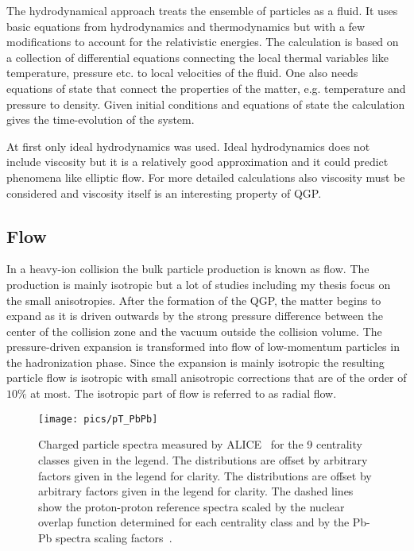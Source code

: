 
The hydrodynamical approach treats the ensemble of particles as a fluid. It uses  basic equations from hydrodynamics and thermodynamics but with a few modifications to account for the relativistic energies. The calculation is based on a collection of differential equations connecting the local thermal variables like temperature, pressure etc. to local velocities of the fluid. One also needs equations of state that connect the properties of the matter, e.g. temperature and pressure to density.  Given initial conditions and equations of state the calculation gives the time-evolution of the system.

At first only ideal hydrodynamics was used. Ideal hydrodynamics does not include viscosity but it is a relatively good approximation and it could predict phenomena like elliptic flow. For more detailed calculations also viscosity must be considered and viscosity itself is an interesting property of QGP.


\FloatBarrier
\pagebreak
\subsection{Flow}
In a heavy-ion collision the bulk particle production is known as flow. The production is mainly isotropic but a lot of studies including my thesis focus on the small anisotropies. After the formation of the QGP, the matter begins to expand as it is driven outwards by the strong pressure difference between the center of the collision zone and the vacuum outside the collision volume. The pressure-driven expansion is transformed into flow of low-momentum particles in the hadronization phase. Since the expansion is mainly isotropic the resulting particle flow is isotropic with small anisotropic corrections that are of the order of $10\%$ at most. The isotropic part of flow is referred to as radial flow. 

\begin{figure}[b!]
\centering
\texttt{[image: pics/pT\_PbPb]}
\caption[Charged particle spectra]{ Charged particle spectra measured by ALICE~\cite{PRL106032301} for the 9 centrality classes given in the legend. The distributions are offset by arbitrary factors given in the legend for clarity. The distributions are offset by arbitrary factors given in the legend for clarity. The dashed lines show the proton-proton reference spectra scaled by the nuclear overlap function determined for each centrality class and by the Pb-Pb spectra scaling factors~\cite{PRL106032301}.}
\label{fig:dndpt}
\end{figure}

